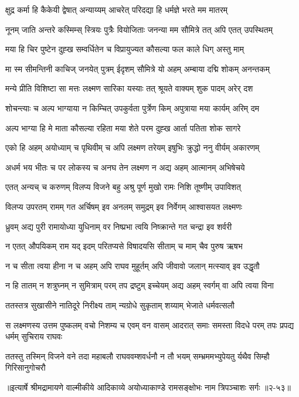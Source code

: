 \twolineshloka
{क्षुद्र कर्मा हि कैकेयी द्वेषात् अन्याय्यम् आचरेत्}
{परिदद्या हि धर्मज्ञे भरते मम मातरम्} %

\twolineshloka
{नूनम् जाति अन्तरे कस्मिम्स् स्त्रियः पुत्रैः वियोजिताः}
{जनन्या मम सौमित्रे तत् अपि एतत् उपस्थितम्} %

\twolineshloka
{मया हि चिर पुष्टेन दुह्ख सम्वर्धितेन च}
{विप्रायुज्यत कौसल्या फल काले धिग् अस्तु माम्} %

\twolineshloka
{मा स्म सीमन्तिनी काचिज् जनयेत् पुत्रम् ईदृशम्}
{सौमित्रे यो अहम् अम्बाया दद्मि शोकम् अनन्तकम्} %

\twolineshloka
{मन्ये प्रीति विशिष्टा सा मत्तः लक्ष्मण सारिका}
{यस्याः तत् श्रूयते वाक्यम् शुक पादम् अरेर् दश} %

\twolineshloka
{शोचन्त्याः च अल्प भाग्याया न किम्चित् उपकुर्वता}
{पुर्त्रेण किम् अपुत्राया मया कार्यम् अरिम् दम} %

\twolineshloka
{अल्प भाग्या हि मे माता कौसल्या रहिता मया}
{शेते परम दुह्ख आर्ता पतिता शोक सागरे} %

\twolineshloka
{एको हि अहम् अयोध्याम् च पृथिवीम् च अपि लक्ष्मण}
{तरेयम् इषुभिः क्रुद्धो ननु वीर्यम् अकारणम्} %

\twolineshloka
{अधर्म भय भीतः च पर लोकस्य च अनघ}
{तेन लक्ष्मण न अद्य अहम् आत्मानम् अभिषेचये} %

\twolineshloka
{एतत् अन्यच् च करुणम् विलप्य विजने बहु}
{अश्रु पूर्ण मुखो रामः निशि तूष्णीम् उपाविशत्} %

\twolineshloka
{विलप्य उपरतम् रामम् गत अर्चिषम् इव अनलम्}
{समुद्रम् इव निर्वेगम् आश्वासयत लक्ष्मणः} %

\twolineshloka
{ध्रुवम् अद्य पुरी रामायोध्या युधिनाम् वर}
{निष्प्रभा त्वयि निष्क्रान्ते गत चन्द्रा इव शर्वरी} %

\twolineshloka
{न एतत् औपयिकम् राम यद् इदम् परितप्यसे}
{विषादयसि सीताम् च माम् चैव पुरुष ऋषभ} %

\twolineshloka
{न च सीता त्वया हीना न च अहम् अपि राघव}
{मुहूर्तम् अपि जीवावो जलान् मत्स्याव् इव उद्धृतौ} %

\twolineshloka
{न हि तातम् न शत्रुघ्नम् न सुमित्राम् परम् तप}
{द्रष्टुम् इच्चेयम् अद्य अहम् स्वर्गम् वा अपि त्वया विना} %

\twolineshloka
{ततस्तत्र सुखासीने नातिदूरे निरीक्ष्य ताम्}
{न्यग्रोधे सुकृताम् शय्याम् भेजाते धर्मवत्सलौ} %

\fourlineindentedshloka
{स लक्ष्मणस्य उत्तम पुष्कलम् वचो}
{निशम्य च एवम् वन वासम् आदरात्}
{समाः समस्ता विदधे परम् तपः}
{प्रपद्य धर्मम् सुचिराय राघवः} %

\fourlineindentedshloka
{ततस्तु तस्मिन् विजने वने तदा}
{महाबलौ राघववम्शवर्धनौ}
{न तौ भयम् सम्भ्रममभ्युपेयतु}
{र्यथैव सिम्हौ गिरिसानुगोचरौ} %


॥इत्यार्षे श्रीमद्रामायणे वाल्मीकीये आदिकाव्ये अयोध्याकाण्डे रामसङ्क्षोभः नाम त्रिपञ्चाशः सर्गः ॥२-५३॥
